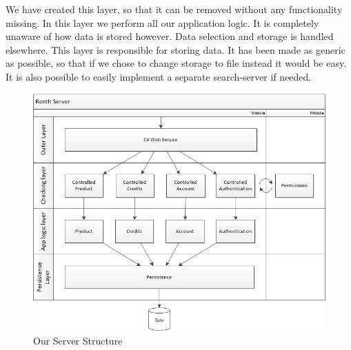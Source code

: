 We have created this layer, so that it can be removed without any functionality missing.
In this layer we perform all our application logic. It is completely unaware of how data is stored however. Data selection and storage is handled elsewhere.
This layer is responsible for storing data. It has been made as generic as possible, so that if we chose to change storage to file instead it would be easy. It is also possible to easily implement a separate search-server if needed.

\begin{figure}[H]
  \includegraphics[width=\textwidth]{illustrations/ServerStructure.png}
  \caption{Our Server Structure}
  \label{fig:serverstructure}
\end{figure}
\newpage